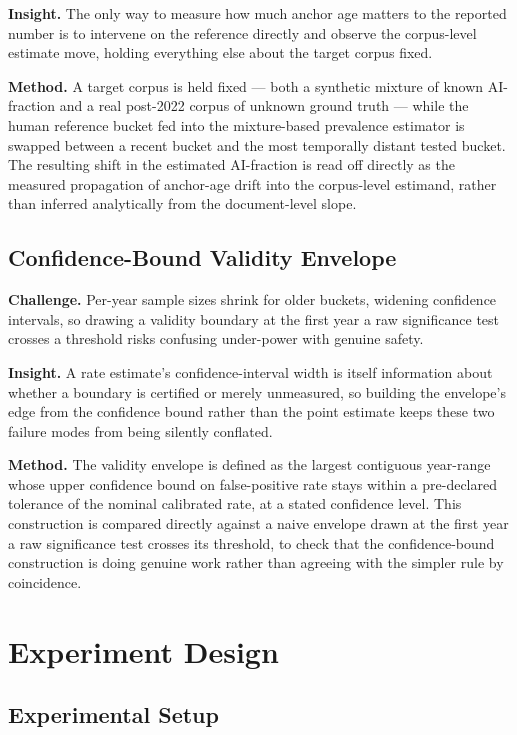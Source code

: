 \documentclass[conference]{IEEEtran}
\begin{document}
\textbf{Insight.} The only way to measure how much anchor age matters to the reported number is to intervene on the reference directly and observe the corpus-level estimate move, holding everything else about the target corpus fixed.

\textbf{Method.} A target corpus is held fixed --- both a synthetic mixture of known AI-fraction and a real post-2022 corpus of unknown ground truth --- while the human reference bucket fed into the mixture-based prevalence estimator is swapped between a recent bucket and the most temporally distant tested bucket. The resulting shift in the estimated AI-fraction is read off directly as the measured propagation of anchor-age drift into the corpus-level estimand, rather than inferred analytically from the document-level slope.

\subsection{Confidence-Bound Validity Envelope}

\textbf{Challenge.} Per-year sample sizes shrink for older buckets, widening confidence intervals, so drawing a validity boundary at the first year a raw significance test crosses a threshold risks confusing under-power with genuine safety.

\textbf{Insight.} A rate estimate's confidence-interval width is itself information about whether a boundary is certified or merely unmeasured, so building the envelope's edge from the confidence bound rather than the point estimate keeps these two failure modes from being silently conflated.

\textbf{Method.} The validity envelope is defined as the largest contiguous year-range whose upper confidence bound on false-positive rate stays within a pre-declared tolerance of the nominal calibrated rate, at a stated confidence level. This construction is compared directly against a naive envelope drawn at the first year a raw significance test crosses its threshold, to check that the confidence-bound construction is doing genuine work rather than agreeing with the simpler rule by coincidence.


\section{Experiment Design}\label{sec:experiments}

\subsection{Experimental Setup}
\end{document}
